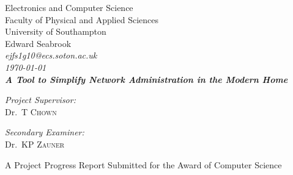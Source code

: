 
\begin{titlepage}

\begin{center}



\LARGE Electronics and Computer Science\\
Faculty of Physical and Applied Sciences\\
University of Southampton
\\[1.5cm]

Edward Seabrook\\
\em ejfs1g10@ecs.soton.ac.uk \em
\\[0.5cm]

\today \\[1cm]
{\bfseries A Tool to Simplify Network Administration in the Modern Home}\\[1.5cm]

\vfill

\begin{minipage}{0.4\textwidth}
\begin{flushleft} \large
\emph{Project Supervisor:} \\
Dr.~T \textsc{Chown}
\end{flushleft}
\end{minipage}
\begin{minipage}{0.4\textwidth}
\begin{flushright} \large
\emph{Secondary Examiner:}\\
Dr.~KP \textsc{Zauner} 
\end{flushright}
\end{minipage} 

\vfill

A Project Progress Report Submitted for the Award of Computer Science

\end{center}

\end{titlepage}
